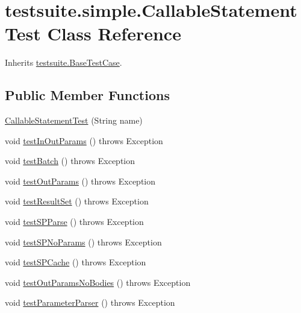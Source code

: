 \hypertarget{classtestsuite_1_1simple_1_1_callable_statement_test}{}\section{testsuite.\+simple.\+Callable\+Statement\+Test Class Reference}
\label{classtestsuite_1_1simple_1_1_callable_statement_test}


Inherits \mbox{\hyperlink{classtestsuite_1_1_base_test_case}{testsuite.\+Base\+Test\+Case}}.

\subsection*{Public Member Functions}
\begin{DoxyCompactItemize}
\item 
\mbox{\hyperlink{classtestsuite_1_1simple_1_1_callable_statement_test_aea47c080476cb1ba38504913a365d668}{Callable\+Statement\+Test}} (String name)
\item 
void \mbox{\hyperlink{classtestsuite_1_1simple_1_1_callable_statement_test_aff9447e7125f78c20b0eab4c5646b013}{test\+In\+Out\+Params}} ()  throws Exception 
\item 
void \mbox{\hyperlink{classtestsuite_1_1simple_1_1_callable_statement_test_ab56a0db2ddecf45b3dbcf0505a0e29dd}{test\+Batch}} ()  throws Exception 
\item 
void \mbox{\hyperlink{classtestsuite_1_1simple_1_1_callable_statement_test_a1b410c096cba5e99995e4e3fb465a1b7}{test\+Out\+Params}} ()  throws Exception 
\item 
void \mbox{\hyperlink{classtestsuite_1_1simple_1_1_callable_statement_test_a8007b7089823f54d85bc02cf1c5427e8}{test\+Result\+Set}} ()  throws Exception 
\item 
void \mbox{\hyperlink{classtestsuite_1_1simple_1_1_callable_statement_test_ad2d1ffaddb39bf287b37661e592ef2f6}{test\+S\+P\+Parse}} ()  throws Exception 
\item 
void \mbox{\hyperlink{classtestsuite_1_1simple_1_1_callable_statement_test_a5382df497dce2b6ecd935d4550a5b505}{test\+S\+P\+No\+Params}} ()  throws Exception 
\item 
void \mbox{\hyperlink{classtestsuite_1_1simple_1_1_callable_statement_test_ac41eeda6e62222c52818858c877b29f3}{test\+S\+P\+Cache}} ()  throws Exception 
\item 
void \mbox{\hyperlink{classtestsuite_1_1simple_1_1_callable_statement_test_a179baddfa438453902f8136cb9cd1041}{test\+Out\+Params\+No\+Bodies}} ()  throws Exception 
\item 
void \mbox{\hyperlink{classtestsuite_1_1simple_1_1_callable_statement_test_a0586bd82e4c828405b924bb8262f464c}{test\+Parameter\+Parser}} ()  throws Exception 
\end{DoxyCompactItemize}
